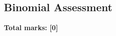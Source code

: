 \documentclass[../s1]{subfiles}
\begin{document}
\subsection*{Binomial Assessment}
\thispagestyle{fancy}



\begin{flushright}
\textbf{Total marks: [0]}
\end{flushright}
\end{document}
